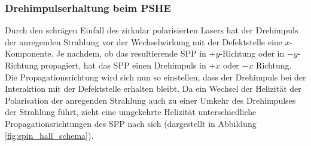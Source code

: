 \documentclass[a4paper, titlepage,  ngerman]{book}
\begin{document}
	\subsubsection{Drehimpulserhaltung beim PSHE}
	Durch den schrägen Einfall des zirkular polarisierten Lasers hat der Drehimpuls der anregenden Strahlung vor der Wechselwirkung mit der Defektstelle eine $x$-Komponente. Je nachdem, ob das resultierende SPP in $+y$-Richtung oder in $-y$-Richtung propagiert, hat das SPP einen Drehimpuls in  $+x$ oder $-x$ Richtung. Die Propagationsrichtung wird sich nun so einstellen, dass der Drehimpuls bei der Interaktion mit der Defektstelle erhalten bleibt. Da ein Wechsel der Helizität der Polarisation der anregenden Strahlung auch zu einer Umkehr des Drehimpulses der Strahlung führt, zieht eine umgekehrte Helizität unterschiedliche Propagationsrichtungen des SPP nach sich (dargestellt in Abbildung \ref{fig:spin_hall_schema}).
\end{document}

